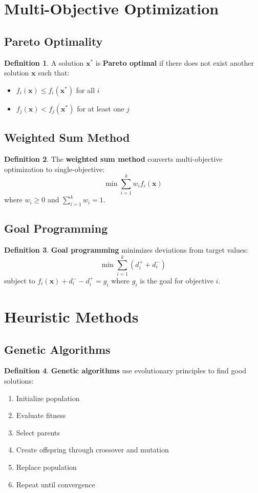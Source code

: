 \documentclass[11pt]{article}
\theoremstyle{definition}
\newtheorem{definition}{Definition}[section]
\begin{document}
\section{Multi-Objective Optimization}

\subsection{Pareto Optimality}
\begin{definition}
A solution $\mathbf{x}^*$ is \textbf{Pareto optimal} if there does not exist another solution $\mathbf{x}$ such that:
\begin{itemize}
    \item $f_i(\mathbf{x}) \leq f_i(\mathbf{x}^*)$ for all $i$
    \item $f_j(\mathbf{x}) < f_j(\mathbf{x}^*)$ for at least one $j$
\end{itemize}
\end{definition}

\subsection{Weighted Sum Method}
\begin{definition}
The \textbf{weighted sum method} converts multi-objective optimization to single-objective:
$$\min \sum_{i=1}^k w_i f_i(\mathbf{x})$$
where $w_i \geq 0$ and $\sum_{i=1}^k w_i = 1$.
\end{definition}

\subsection{Goal Programming}
\begin{definition}
\textbf{Goal programming} minimizes deviations from target values:
$$\min \sum_{i=1}^k (d_i^+ + d_i^-)$$
subject to $f_i(\mathbf{x}) + d_i^- - d_i^+ = g_i$ where $g_i$ is the goal for objective $i$.
\end{definition}

\section{Heuristic Methods}

\subsection{Genetic Algorithms}
\begin{definition}
\textbf{Genetic algorithms} use evolutionary principles to find good solutions:
\begin{enumerate}
    \item Initialize population
    \item Evaluate fitness
    \item Select parents
    \item Create offspring through crossover and mutation
    \item Replace population
    \item Repeat until convergence
\end{enumerate}
\end{definition}
\end{document}
